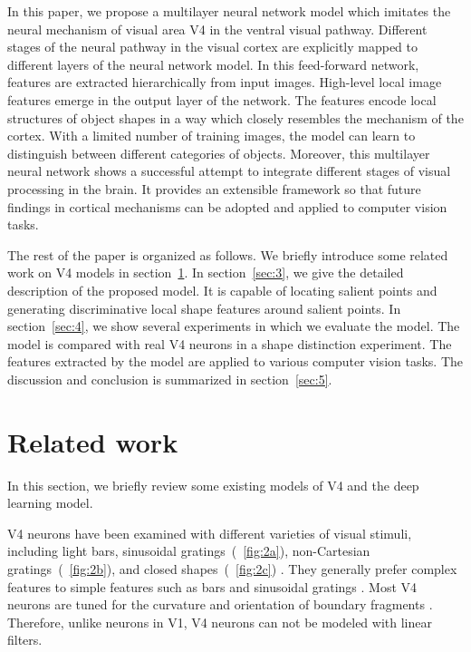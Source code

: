 \documentclass[twocolumn]{article}
\begin{document}
In this paper, we propose a multilayer neural network model which imitates the neural mechanism of visual area V4 in the ventral visual pathway.
Different stages of the neural pathway in the visual cortex are explicitly mapped to different layers of the neural network model.
In this feed-forward network, features are extracted hierarchically from input images.
High-level local image features emerge in the output layer of the network. 
The features encode local structures of object shapes in a way which closely resembles the mechanism of the cortex.
With a limited number of training images, the model can learn to distinguish between different categories of objects.
Moreover, this multilayer neural network shows a successful attempt to integrate different stages of visual processing in the brain. 
It provides an extensible framework so that future findings in cortical mechanisms can be adopted and applied to computer vision tasks.

The rest of the paper is organized as follows.
We briefly introduce some related work on V4 models in section~\ref{sec:2}.
In section~\ref{sec:3}, we give the detailed description of the proposed model.
It is capable of locating salient points and generating discriminative local shape features around salient points.
In section~\ref{sec:4}, we show several experiments in which we evaluate the model.
The model is compared with real V4 neurons in a shape distinction experiment.
The features extracted by the model are applied to various computer vision tasks.
The discussion and conclusion is summarized in section~\ref{sec:5}.

\section{Related work}\label{sec:2}

In this section, we briefly review some existing models of V4 and the deep learning model.

V4 neurons have been examined with different varieties of visual stimuli, including light bars, sinusoidal gratings~(\figurename~\ref{fig:2a}),
non-Cartesian gratings~(\figurename~\ref{fig:2b}), and closed shapes~(\figurename~\ref{fig:2c}) \cite{gallant1996,pasupathy2001}.
They generally prefer complex features to simple features such as bars and sinusoidal gratings \cite{gallant1996}.
Most V4 neurons are tuned for the curvature and orientation of boundary fragments \cite{pasupathy2001}.
Therefore, unlike neurons in V1, V4 neurons can not be modeled with linear filters.
\end{document}
